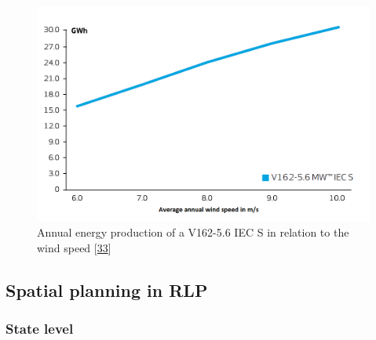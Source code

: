 \documentclass[a4paper,11pt]{article}
\begin{document}
\begin{figure}[H]

{\centering \includegraphics[width=0.8\linewidth]{figures/V162} 

}

\caption{Annual energy production of a V162-5.6 IEC S in relation to the wind speed {[}\protect\hyperlink{ref-VestasWindSystemsAS.2019}{33}{]}}\label{fig:v162}
\end{figure}
\hypertarget{spatial-planning-in-rlp}{%
\subsection{Spatial planning in RLP}\label{spatial-planning-in-rlp}}

\hypertarget{state-level}{%
\subsubsection{State level}\label{state-level}}
\end{document}
